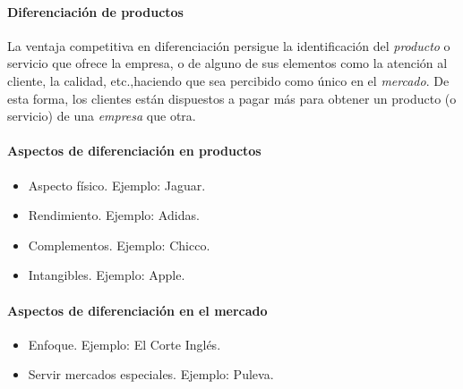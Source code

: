 \documentclass[12pt]{article}
\theoremstyle{definition_wo_parentheses}
\begin{document}


\paragraph{Diferenciación de productos} La ventaja competitiva en diferenciación persigue la identificación del \textit{producto} o servicio que ofrece la empresa, o de alguno de sus elementos como la atención al cliente, la calidad, etc.,haciendo que sea percibido como único en el \textit{mercado}. De esta forma, los clientes están dispuestos a pagar más para obtener un producto (o servicio) de una \textit{empresa} que otra.

\paragraph{Aspectos de diferenciación en productos}
\begin{itemize}
\item Aspecto físico. Ejemplo: Jaguar.
\item Rendimiento. Ejemplo: Adidas.
\item Complementos. Ejemplo: Chicco.
\item Intangibles. Ejemplo: Apple.
\end{itemize}

\paragraph{Aspectos de diferenciación en el mercado}
\begin{itemize}
\item Enfoque. Ejemplo: El Corte Inglés.
\item Servir mercados especiales. Ejemplo: Puleva.
\end{itemize}
\end{document}
